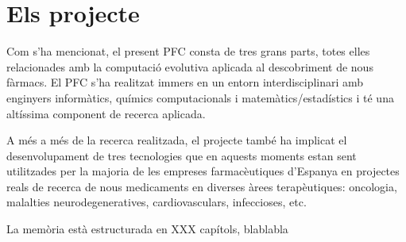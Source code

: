\section{Els projecte}

Com s'ha mencionat, el present PFC consta de tres grans
parts, totes elles relacionades amb la computació evolutiva aplicada al
descobriment de nous fàrmacs. El PFC s'ha realitzat immers en un entorn
interdisciplinari amb enginyers informàtics, químics computacionals i
matemàtics/estadístics i té una altíssima component de recerca aplicada. 

A més a més de la recerca realitzada, el projecte també ha implicat el
desenvolupament de tres tecnologies que en aquests moments estan sent
utilitzades per la majoria de les empreses farmacèutiques d'Espanya en projectes
reals de recerca de nous medicaments en diverses àrees terapèutiques: oncologia,
malalties neurodegeneratives, cardiovasculars, infeccioses, etc.

La memòria està estructurada en XXX capítols, blablabla
